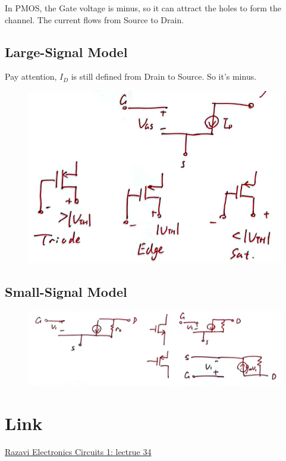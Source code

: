 \documentclass[fontset=windows]{article}
\begin{document}
In PMOS, the Gate voltage is minus, so it can attract the holes to form the channel. 
The current flows from Source to Drain. 

\subsection*{Large-Signal Model}

Pay attention, $I_D$ is still defined from Drain to Source. So it's minus. 

\begin{figure}[htbp]
    \centering
    \includegraphics[scale=0.5]{9.jpg}
    \captionsetup{labelformat=empty}
    \caption{}
    \label{9}
\end{figure}

\subsection*{Small-Signal Model}

\begin{figure}[htbp]
    \centering
    \includegraphics[scale=0.45]{10.jpg}
    \captionsetup{labelformat=empty}
    \caption{}
    \label{10}
\end{figure}

\section*{Link}

\href{https://www.bilibili.com/video/BV1FD4y1R7Ah?p=34&vd_source=1d0c07486a3bd3b0adb8ac548bf6453e}{Razavi Electronics Circuits 1: lectrue 34}
\end{document}

